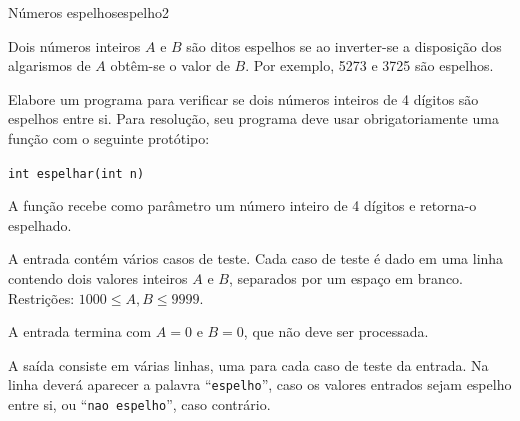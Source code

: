 \documentclass[12pt,a4paper,oneside]{article}
\begin{document}
\begin{problem}{Números espelhos}{espelho}{2}

Dois números inteiros $A$ e $B$ são ditos espelhos se ao inverter-se a disposição dos algarismos de $A$ obtêm-se o valor de $B$. Por exemplo, 5273 e 3725 são espelhos.

Elabore um programa para verificar se dois números inteiros de 4 dígitos são espelhos entre si. Para resolução, seu programa deve usar obrigatoriamente uma função com o seguinte
protótipo:

\texttt{\textcolor{Mulberry}{int} espelhar(\textcolor{Mulberry}{int} n)}

A função recebe como parâmetro um número inteiro de 4 dígitos e retorna-o espelhado.

%

\InputFile

A entrada contém vários casos de teste. Cada caso de teste é dado em uma linha contendo dois valores inteiros $A$ e $B$, separados por um espaço em branco. Restrições: $1000 \leq A, B \leq 9999$.

A entrada termina com $A = 0$ e $B = 0$, que não deve ser processada.

\OutputFile

A saída consiste em várias linhas, uma para cada caso de teste da entrada. Na linha deverá aparecer a palavra ``\texttt{espelho}'', caso os valores entrados sejam espelho entre si, ou ``\texttt{nao espelho}'', caso contrário.


\Example

\begin{example}
%
\end{example}




\end{problem}
\end{document}
